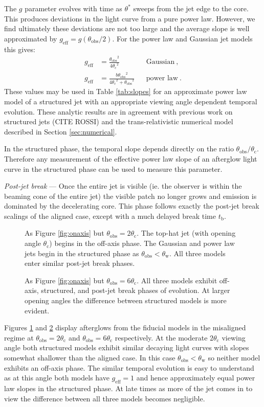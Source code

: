 \documentclass[twocolumn]{aastex62}
\newcommand{\tb}{\ensuremath{t_{\mathrm{b}}}}
\newcommand{\thobs}{\ensuremath{\theta_{\mathrm{obs}}}}
\newcommand{\thW}{\ensuremath{\theta_{\mathrm{w}}}}
\newcommand{\thC}{\ensuremath{\theta_{\mathrm{c}}}}
\newcommand{\geff}{\ensuremath{g_{\mathrm{eff}}}}
\begin{document}
The $g$ parameter evolves with time as $\theta^*$ sweeps from the jet edge to the core.  This produces deviations in the light curve from a pure power law.  However, we find ultimately these deviations are not too large and the average slope is well approximated by $\geff  = g(\thobs/2)$.  For the power law and Gaussian jet models this gives:
\begin{align}
	\geff &= \frac{\thobs^2}{4\thC^2} && \text{Gaussian}\ , \\
	\geff &= \frac{b \thobs^2}{4 \thC^2+\thobs^2} && \text{power law}\ . \label{eq:geff}
\end{align}
These values may be used in Table \ref{tab:slopes} for an approximate power law model of a structured jet with an appropriate viewing angle dependent temporal evolution.  These analytic results are in agreement with previous work on structured jets (CITE ROSSI) and the trans-relativistic numerical model described in Section \ref{sec:numerical}.

In the structured phase, the temporal slope depends directly on the ratio $\thobs/\thC$.  Therefore any measurement of the effective power law slope of an afterglow light curve in the structured phase can be used to measure this parameter.

\emph{Post-jet break} --- Once the entire jet is visible (ie. the observer is within the beaming cone of the entire jet) the visible patch no longer grows and emission is dominated by the decelerating core.  This phase follows exactly the post-jet break scalings of the aligned case, except with a much delayed break time $\tb$.

\begin{figure}
	\caption{As Figure \ref{fig:onaxis} but $\thobs = 2\thC$.  The top-hat jet (with opening angle $\thC$) begins in the off-axis phase.  The Gaussian and power law jets begin in the structured phase as $\thobs < \thW$.  All three models enter similar post-jet break phases. \label{fig:offaxis1}}
\end{figure}
\begin{figure}
	\caption{As Figure \ref{fig:onaxis} but $\thobs = 6\thC$. All three models exhibit off-axis, structured, and post-jet break phases of evolution.  At larger opening angles the difference between structured models is more evident.  \label{fig:offaxis2}}
\end{figure}

Figures \ref{fig:offaxis1} and \ref{fig:offaxis2} display afterglows from the fiducial models in the misaligned regime at $\thobs = 2\thC$ and $\thobs=6\thC$ respectively.  At the moderate $2\thC$ viewing angle both structured models exhibit similar decaying light curves with slopes somewhat shallower than the aligned case. In this case $\thobs < \thW$ so neither model exhibits an off-axis phase.  The similar temporal evolution is easy to understand as at this angle both models have $\geff = 1$ and hence approximately equal power law slopes in the structured phase.  At late times as more of the jet comes in to view the difference between all three models becomes negligible. 
\end{document}
